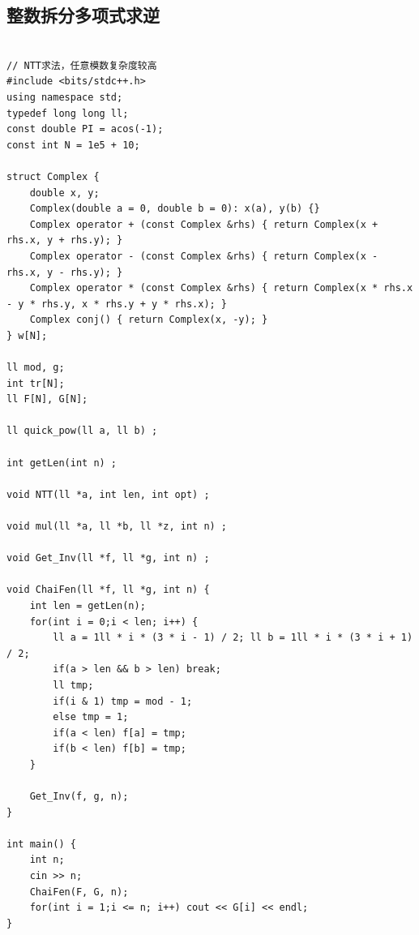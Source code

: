 \documentclass[twoside]{article}
\begin{document}
\subsection{整数拆分多项式求逆}
\begin{lstlisting}

// NTT求法，任意模数复杂度较高
#include <bits/stdc++.h>
using namespace std;
typedef long long ll;
const double PI = acos(-1);
const int N = 1e5 + 10;

struct Complex {
    double x, y;
    Complex(double a = 0, double b = 0): x(a), y(b) {}
    Complex operator + (const Complex &rhs) { return Complex(x + rhs.x, y + rhs.y); }
    Complex operator - (const Complex &rhs) { return Complex(x - rhs.x, y - rhs.y); }
    Complex operator * (const Complex &rhs) { return Complex(x * rhs.x - y * rhs.y, x * rhs.y + y * rhs.x); }
    Complex conj() { return Complex(x, -y); }
} w[N];

ll mod, g;
int tr[N];
ll F[N], G[N];

ll quick_pow(ll a, ll b) ;

int getLen(int n) ;

void NTT(ll *a, int len, int opt) ;

void mul(ll *a, ll *b, ll *z, int n) ;

void Get_Inv(ll *f, ll *g, int n) ;

void ChaiFen(ll *f, ll *g, int n) {
    int len = getLen(n);
    for(int i = 0;i < len; i++) {
        ll a = 1ll * i * (3 * i - 1) / 2; ll b = 1ll * i * (3 * i + 1) / 2;
        if(a > len && b > len) break;
        ll tmp;
        if(i & 1) tmp = mod - 1;
        else tmp = 1;
        if(a < len) f[a] = tmp;
        if(b < len) f[b] = tmp;
    }

    Get_Inv(f, g, n);
}

int main() {
    int n;
    cin >> n;
    ChaiFen(F, G, n);
    for(int i = 1;i <= n; i++) cout << G[i] << endl;
}
\end{lstlisting}
\end{document}
